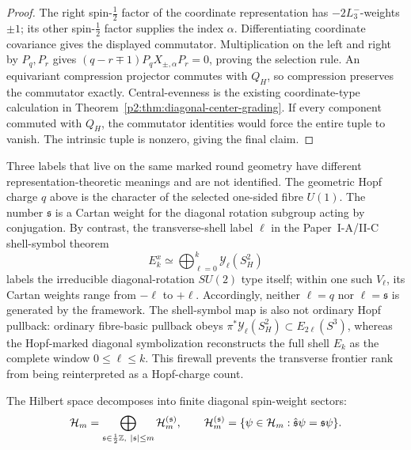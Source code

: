 \documentclass[12pt,a4paper]{article}
\begin{document}
\begin{proof}
The right spin-\(\tfrac12\) factor of the coordinate representation has
\(-2L_3^-\)-weights \(\pm1\); its other spin-\(\tfrac12\) factor
supplies the index \(\alpha\).  Differentiating coordinate covariance
gives the displayed commutator.  Multiplication on the left and right by
\(P_q,P_r\) gives
\((q-r\mp1)P_qX_{\pm,\alpha}P_r=0\), proving the selection rule.
An equivariant compression projector commutes with \(Q_H\), so compression
preserves the commutator exactly.  Central-evenness is the existing
coordinate-type calculation in Theorem~\ref{p2:thm:diagonal-center-grading}.
If every component commuted with \(Q_H\), the commutator identities would
force the entire tuple to vanish.  The intrinsic tuple is nonzero, giving
the final claim.
\end{proof}


\begin{remark}
\label{p2d:rem:hopf-charge-versus-transverse-shell-degree}
Three labels that live on the same marked round geometry have different
representation-theoretic meanings and are not identified.  The geometric
Hopf charge \(q\) above is the character of the selected one-sided fibre
\(U(1)\).  The number \(\mathfrak s\) is a Cartan weight for the diagonal
rotation subgroup acting by conjugation.  By contrast, the transverse-shell
label \(\ell\) in the Paper~I-A/II-C shell-symbol theorem
\[
 E_k^x\simeq\bigoplus_{\ell=0}^{k}\mathscr Y_\ell(S_H^2)
\]
labels the irreducible diagonal-rotation \(SU(2)\) type itself; within one
such \(V_\ell\), its Cartan weights range from \(-\ell\) to \(+\ell\).
Accordingly, neither \(\ell=q\) nor \(\ell=\mathfrak s\) is generated by the
framework.  The shell-symbol map is also not ordinary Hopf pullback:
ordinary fibre-basic pullback obeys
\(\pi^*\mathscr Y_\ell(S_H^2)\subset E_{2\ell}(S^3)\), whereas the
Hopf-marked diagonal symbolization reconstructs the full shell \(E_k\) as the
complete window \(0\le\ell\le k\).  This firewall prevents the transverse
frontier rank from being reinterpreted as a Hopf-charge count.
\end{remark}

\begin{proposition}
\label{p2:prop:diagonal-spin-weight-sector-decomposition}
The Hilbert space decomposes into finite diagonal spin-weight sectors:
\begin{equation}
\mathcal H_m=\bigoplus_{\mathfrak s\in \frac12\mathbb{Z},\ |\mathfrak s|\le m}\mathcal H_m^{(\mathfrak s)},
\qquad
\mathcal H_m^{(\mathfrak s)}
=
\{\psi\in\mathcal H_m:\hat{\mathfrak s}\psi=\mathfrak s\psi\}.
\end{equation}
\end{proposition}
\end{document}
